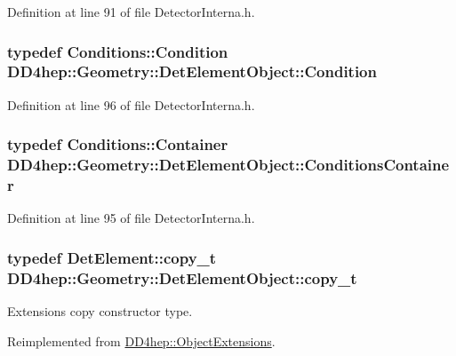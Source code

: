 Definition at line 91 of file DetectorInterna.h.\hypertarget{class_d_d4hep_1_1_geometry_1_1_det_element_object_ad16c1a834041ed152dee870f1ec346da}{
\subsubsection[{Condition}]{\setlength{\rightskip}{0pt plus 5cm}typedef {\bf Conditions::Condition} {\bf DD4hep::Geometry::DetElementObject::Condition}}}
\label{class_d_d4hep_1_1_geometry_1_1_det_element_object_ad16c1a834041ed152dee870f1ec346da}


Definition at line 96 of file DetectorInterna.h.\hypertarget{class_d_d4hep_1_1_geometry_1_1_det_element_object_a01728952c7dd2f2c102e2a1ae25b80ff}{
\subsubsection[{ConditionsContainer}]{\setlength{\rightskip}{0pt plus 5cm}typedef {\bf Conditions::Container} {\bf DD4hep::Geometry::DetElementObject::ConditionsContainer}}}
\label{class_d_d4hep_1_1_geometry_1_1_det_element_object_a01728952c7dd2f2c102e2a1ae25b80ff}


Definition at line 95 of file DetectorInterna.h.\hypertarget{class_d_d4hep_1_1_geometry_1_1_det_element_object_a2780058563d2399014b51afa789ebd21}{
\subsubsection[{copy\_\-t}]{\setlength{\rightskip}{0pt plus 5cm}typedef {\bf DetElement::copy\_\-t} {\bf DD4hep::Geometry::DetElementObject::copy\_\-t}}}
\label{class_d_d4hep_1_1_geometry_1_1_det_element_object_a2780058563d2399014b51afa789ebd21}


Extensions copy constructor type. 

Reimplemented from \hyperlink{class_d_d4hep_1_1_object_extensions_ab58b60490186d1adc0c5585ad691a7c2}{DD4hep::ObjectExtensions}.


